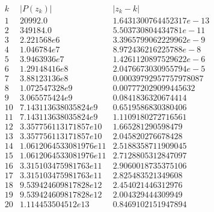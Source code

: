 $$
\begin{array}{c|c|c}
k & |P(z_k)| & |z_k - k|\\
\hline
1 & 20992.0 & 1.6431300764452317e-13\\
2 & 349184.0 & 5.503730804434781e-11\\
3 & 2.221568e6 & 3.3965799062229962e-9\\
4 & 1.046784e7 & 8.972436216225788e-8\\
5 & 3.9463936e7 & 1.4261120897529622e-6\\
6 & 1.29148416e8 & 2.0476673030955794e-5\\
7 & 3.88123136e8 & 0.00039792957757978087\\
8 & 1.072547328e9 & 0.007772029099445632\\
9 & 3.065575424e9 & 0.0841836320674414\\
10 & 7.143113638035824e9 & 0.6519586830380406\\
11 & 7.143113638035824e9 & 1.1109180272716561\\
12 & 3.357756113171857e10 & 1.665281290598479\\
13 & 3.357756113171857e10 & 2.045820276678428\\
14 & 1.0612064533081976e11 & 2.5188358711909045\\
15 & 1.0612064533081976e11 & 2.7128805312847097\\
16 & 3.315103475981763e11 & 2.9060018735375106\\
17 & 3.315103475981763e11 & 2.825483521349608\\
18 & 9.539424609817828e12 & 2.454021446312976\\
19 & 9.539424609817828e12 & 2.004329444309949\\
20 & 1.114453504512e13 & 0.8469102151947894\\
\end{array}
$$
